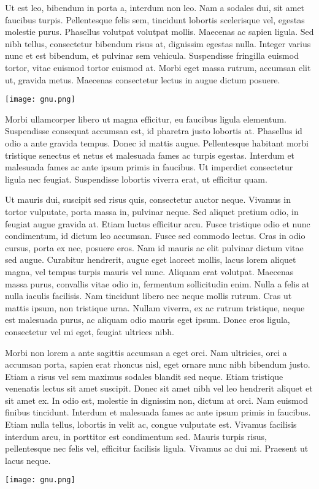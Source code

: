 Ut est leo, bibendum in porta a, interdum non leo. Nam a sodales dui, sit amet faucibus turpis. Pellentesque felis sem, tincidunt lobortis scelerisque vel, egestas molestie purus. Phasellus volutpat volutpat mollis. Maecenas ac sapien ligula. Sed nibh tellus, consectetur bibendum risus at, dignissim egestas nulla. Integer varius nunc et est bibendum, et pulvinar sem vehicula. Suspendisse fringilla euismod tortor, vitae euismod tortor euismod at. Morbi eget massa rutrum, accumsan elit ut, gravida metus. Maecenas consectetur lectus in augue dictum posuere.

\begin{center}
\texttt{[image: gnu.png]}
\end{center}

Morbi ullamcorper libero ut magna efficitur, eu faucibus ligula elementum. Suspendisse consequat accumsan est, id pharetra justo lobortis at. Phasellus id odio a ante gravida tempus. Donec id mattis augue. Pellentesque habitant morbi tristique senectus et netus et malesuada fames ac turpis egestas. Interdum et malesuada fames ac ante ipsum primis in faucibus. Ut imperdiet consectetur ligula nec feugiat. Suspendisse lobortis viverra erat, ut efficitur quam.

Ut mauris dui, suscipit sed risus quis, consectetur auctor neque. Vivamus in tortor vulputate, porta massa in, pulvinar neque. Sed aliquet pretium odio, in feugiat augue gravida at. Etiam luctus efficitur arcu. Fusce tristique odio et nunc condimentum, id dictum leo accumsan. Fusce sed commodo lectus. Cras in odio cursus, porta ex nec, posuere eros. Nam id mauris ac elit pulvinar dictum vitae sed augue. Curabitur hendrerit, augue eget laoreet mollis, lacus lorem aliquet magna, vel tempus turpis mauris vel nunc. Aliquam erat volutpat. Maecenas massa purus, convallis vitae odio in, fermentum sollicitudin enim. Nulla a felis at nulla iaculis facilisis. Nam tincidunt libero nec neque mollis rutrum. Cras ut mattis ipsum, non tristique urna. Nullam viverra, ex ac rutrum tristique, neque est malesuada purus, ac aliquam odio mauris eget ipsum. Donec eros ligula, consectetur vel mi eget, feugiat ultrices nibh.

Morbi non lorem a ante sagittis accumsan a eget orci. Nam ultricies, orci a accumsan porta, sapien erat rhoncus nisl, eget ornare nunc nibh bibendum justo. Etiam a risus vel sem maximus sodales blandit sed neque. Etiam tristique venenatis lectus sit amet suscipit. Donec sit amet nibh vel leo hendrerit aliquet et sit amet ex. In odio est, molestie in dignissim non, dictum at orci. Nam euismod finibus tincidunt. Interdum et malesuada fames ac ante ipsum primis in faucibus. Etiam nulla tellus, lobortis in velit ac, congue vulputate est. Vivamus facilisis interdum arcu, in porttitor est condimentum sed. Mauris turpis risus, pellentesque nec felis vel, efficitur facilisis ligula. Vivamus ac dui mi. Praesent ut lacus neque.
\begin{center}
\texttt{[image: gnu.png]}
\end{center}

